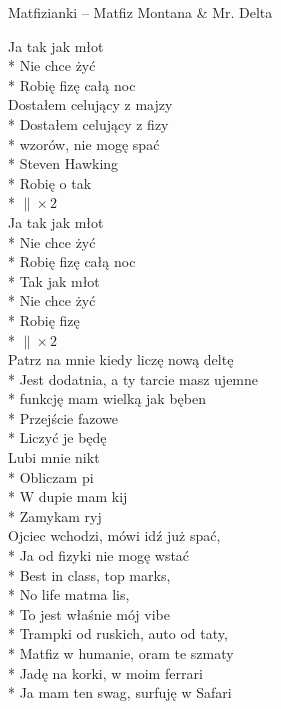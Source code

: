 \begin{piosenka_dluga}{Matfizianki -- Matfiz Montana \& Mr. Delta}

Ja tak jak młot \\*
Nie chce żyć \\*
Robię fizę całą noc \\[\zwrotkaspace]

 Dostałem celujący z majzy \\*
 Dostałem celujący z fizy \\*
 wzorów, nie mogę spać \\*
 Steven Hawking \\*
 Robię o tak \\*
 $\| \times 2$ \\[\zwrotkaspace]

 Ja tak jak młot \\*
 Nie chce żyć \\*
 Robię fizę całą noc \\*
 Tak jak młot \\*
 Nie chce żyć \\*
 Robię fizę \\*
 $\| \times 2$ \\[\zwrotkaspace]

Patrz na mnie kiedy liczę nową deltę \\*
Jest dodatnia, a ty tarcie masz ujemne \\*
funkcję mam wielką jak bęben \\*
Przejście fazowe \\*
Liczyć je będę \\[\zwrotkaspace]

Lubi mnie nikt \\*
Obliczam pi \\*
W dupie mam kij \\*
Zamykam ryj \\[\zwrotkaspace]

Ojciec wchodzi, mówi idź już spać, \\*
Ja od fizyki nie mogę wstać \\*
Best in class, top marks, \\*
No life matma lis, \\*
To jest właśnie mój vibe \\*
Trampki od ruskich, auto od taty, \\*
Matfiz w humanie, oram te szmaty \\*
Jadę na korki, w moim ferrari \\*
Ja mam ten swag, surfuję w Safari \\[\zwrotkaspace]


\end{piosenka_dluga}
